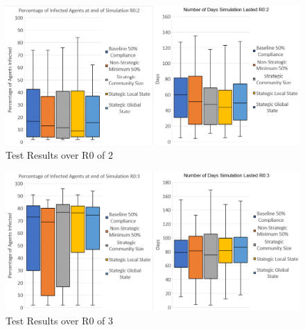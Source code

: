 \documentclass{article}
\begin{document}
\begin{figure}[h!]
\centering
\includegraphics[width=\textwidth]{5}
\caption{Test Results over R0 of 2}
\end{figure}

\newpage
\begin{figure}[h!]
\centering
\includegraphics[width=\textwidth]{4}
\caption{Test Results over R0 of 3}
\end{figure}
\end{document}
